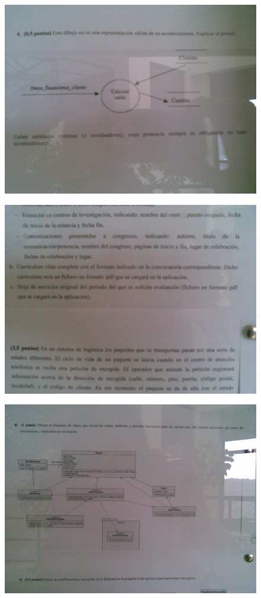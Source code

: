 \documentclass[12pt,a4paper]{report}
\begin{document}
\begin{figure}
  \includegraphics[width=\textwidth]{./images/jun/Imagen077.jpg}
\end{figure}
\begin{figure}
  \includegraphics[width=\textwidth]{./images/jun/Imagen081.jpg}
\end{figure}
\begin{figure}
  \includegraphics[width=\textwidth]{./images/jun/Imagen083.jpg}
\end{figure}
\end{document}

